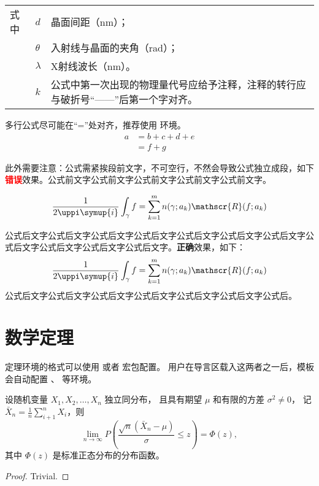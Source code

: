 \noindent%
\begin{minipage}{\textwidth}
  \begin{tabularx}{\textwidth}{@{}l@{~}l@{~——~}X@{}}
    式中 & $d$ & 晶面间距（nm）；\\
    & $\theta$ & 入射线与晶面的夹角（rad）；\\
    & $\lambda$ & X射线波长（nm）。\\
    & $k$ & 公式中第一次出现的物理量代号应给予注释，注释的转行应与破折号“——”后第一个字对齐。
  \end{tabularx}
\end{minipage}

多行公式尽可能在“=”处对齐，推荐使用  环境。
\begin{align}
  a & = b + c + d + e \\
    & = f + g
\end{align}

此外需要注意：公式需紧挨段前文字，不可空行，不然会导致公式独立成段，如下\textcolor{red}{\textbf{错误}}效果。公式前文字公式前文字公式前文字公式前文字公式前文字。

\begin{equation}
  \frac{1}{2 \uppi \symup{i}} \int_\gamma f = \sum_{k=1}^m n(\gamma; a_k) \mathscr{R}(f; a_k)
\end{equation}

公式后文字公式后文字公式后文字公式后文字公式后文字公式后文字公式后文字公式后文字公式后文字公式后文字公式后文字。\textbf{正确}效果，如下：
\begin{equation}
  \frac{1}{2 \uppi \symup{i}} \int_\gamma f = \sum_{k=1}^m n(\gamma; a_k) \mathscr{R}(f; a_k)
\end{equation}
公式后文字公式后文字公式后文字公式后文字公式后文字公式后文字公式后。

\section{数学定理}

定理环境的格式可以使用  或者  宏包配置。
用户在导言区载入这两者之一后，模板会自动配置 、 等环境。

\begin{theorem}
  设随机变量 $X_1, X_2, \dots, X_n$ 独立同分布， 且具有期望 $\mu$ 和有限的方差 $\sigma^2 \ne 0$，
  记 $\bar{X}_n = \frac{1}{n} \sum_{i+1}^n X_i$，则
  \begin{equation}
    \lim_{n \to \infty} P \left(\frac{\sqrt{n} \left( \bar{X}_n - \mu \right)}{\sigma} \le z \right) = \Phi(z),
  \end{equation}
  其中 $\Phi(z)$ 是标准正态分布的分布函数。
\end{theorem}
\begin{proof}
  Trivial.
\end{proof}

